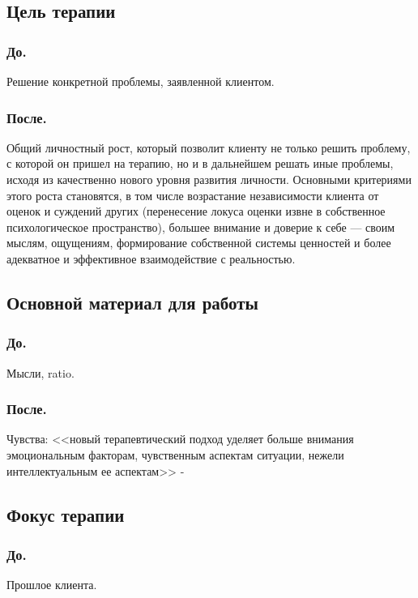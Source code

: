\documentclass{../../common/thesisbyxetex}
\begin{document}
\subsection*{Цель терапии}

\subsubsection*{До.}

Решение конкретной проблемы, заявленной клиентом.

\subsubsection*{После.} 

Общий личностный рост, который позволит клиенту не только решить проблему, с которой он 
пришел на терапию, но и в дальнейшем решать иные проблемы, исходя из качественно нового уровня 
развития личности. Основными критериями этого роста становятся, в том числе возрастание 
независимости клиента от оценок и суждений других (перенесение локуса оценки извне в собственное 
психологическое пространство), большее внимание и доверие к себе --- своим мыслям, ощущениям,  
формирование собственной системы ценностей и более адекватное и эффективное взаимодействие с 
реальностью.

\subsection*{Основной материал для работы}

\subsubsection*{До.}

Мысли, ratio.

\subsubsection*{После.}

Чувства: <<новый терапевтический подход уделяет больше внимания эмоциональным 
факторам, чувственным аспектам ситуации, нежели интеллектуальным ее аспектам>> 
\cite[14]{rogersConsult} - 

\subsection*{Фокус терапии}

\subsubsection*{До.}
Прошлое клиента.
\end{document}

